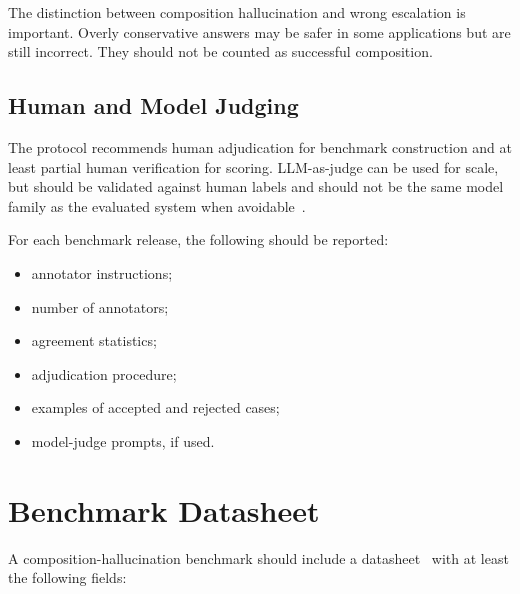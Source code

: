 \documentclass[11pt]{article}
\begin{document}
The distinction between composition hallucination and wrong escalation is important. Overly conservative answers may be safer in some applications but are still incorrect. They should not be counted as successful composition.

\subsection{Human and Model Judging}

The protocol recommends human adjudication for benchmark construction and at least partial human verification for scoring. LLM-as-judge can be used for scale, but should be validated against human labels and should not be the same model family as the evaluated system when avoidable~\cite{chen2023felm,li2023halueval}.

For each benchmark release, the following should be reported:

\begin{itemize}[leftmargin=*,itemsep=2pt]
    \item annotator instructions;
    \item number of annotators;
    \item agreement statistics;
    \item adjudication procedure;
    \item examples of accepted and rejected cases;
    \item model-judge prompts, if used.
\end{itemize}

\section{Benchmark Datasheet}

A composition-hallucination benchmark should include a datasheet~\cite{gebru2021datasheets} with at least the following fields:
\end{document}
